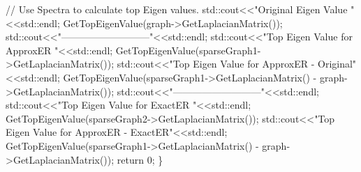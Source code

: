 \begin{DoxyCode}
    \textcolor{comment}{// Use Spectra to calculate top Eigen values. }
    std::cout<<\textcolor{stringliteral}{"Original Eigen Value "} <<std::endl;
    GetTopEigenValue(graph->GetLaplacianMatrix());
    std::cout<<\textcolor{stringliteral}{"---------------------------"}<<std::endl;
    std::cout<<\textcolor{stringliteral}{"Top Eigen Value for ApproxER "}<<std::endl;
    GetTopEigenValue(sparseGraph1->GetLaplacianMatrix());
    std::cout<<\textcolor{stringliteral}{"Top Eigen Value for ApproxER - Original"}<<std::endl;
    GetTopEigenValue(sparseGraph1->GetLaplacianMatrix() - graph->GetLaplacianMatrix());
    std::cout<<\textcolor{stringliteral}{"---------------------------"}<<std::endl;
    std::cout<<\textcolor{stringliteral}{"Top Eigen Value for ExactER "}<<std::endl;
    GetTopEigenValue(sparseGraph2->GetLaplacianMatrix());
    std::cout<<\textcolor{stringliteral}{"Top Eigen Value for ApproxER - ExactER"}<<std::endl;
    GetTopEigenValue(sparseGraph1->GetLaplacianMatrix() - graph->GetLaplacianMatrix());
    \textcolor{keywordflow}{return} 0;
\}
\end{DoxyCode}
 